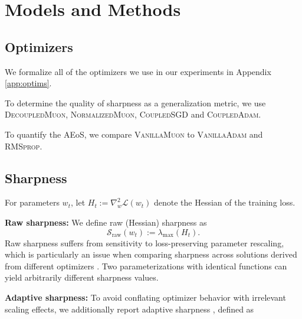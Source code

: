 \documentclass{article}
\theoremstyle{plain}
\theoremstyle{definition}
\theoremstyle{remark}
\begin{document}





\section{Models and Methods}
\subsection{Optimizers}

We formalize all of the optimizers we use in our experiments in Appendix \ref{app:optims}. 

To determine the quality of sharpness as a generalization metric, we use \textsc{DecoupledMuon}, \textsc{NormalizedMuon}, \textsc{CoupledSGD} and \textsc{CoupledAdam}.

To quantify the AEoS, we compare \textsc{VanillaMuon} to \textsc{VanillaAdam} and \textsc{RMSprop}.

\subsection{Sharpness}
For parameters $w_t$, let $H_t := \nabla_w^2 \mathcal{L}(w_t)$ denote the Hessian of the training loss.

\textbf{Raw sharpness:} We define raw (Hessian) sharpness as
\begin{equation}
\mathcal{S}_{\text{raw}}(w_t) := \lambda_{\max}(H_t).
\end{equation}
Raw sharpness suffers from sensitivity to loss-preserving parameter rescaling, which is particularly an issue when comparing sharpness across solutions derived from different optimizers \cite{kwon2021asam}. Two parameterizations with identical functions can yield arbitrarily different sharpness values.

\textbf{Adaptive sharpness:} To avoid conflating optimizer behavior with irrelevant scaling effects, we additionally report adaptive sharpness \cite{kwon2021asam}, defined as
\end{document}
